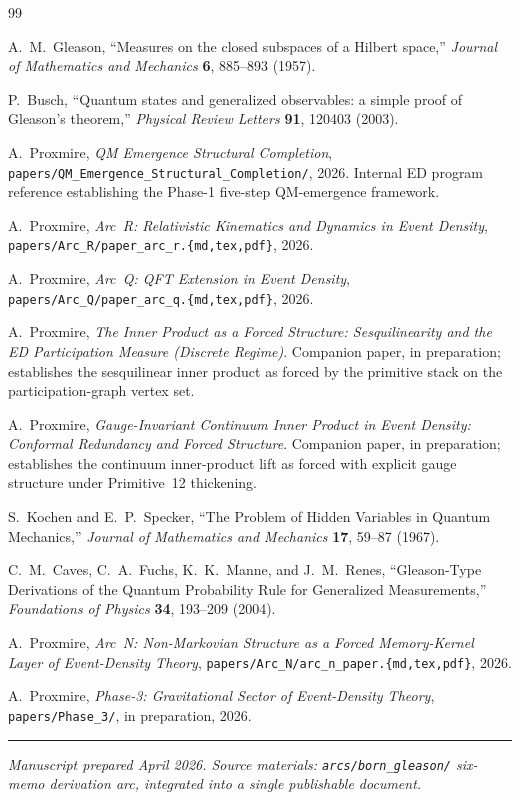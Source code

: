 \documentclass[11pt,a4paper]{article}
\begin{document}
\begin{thebibliography}{99}

A.~M.~Gleason, ``Measures on the closed subspaces of a Hilbert space,'' \emph{Journal of Mathematics and Mechanics} \textbf{6}, 885--893 (1957).

P.~Busch, ``Quantum states and generalized observables: a simple proof of Gleason's theorem,'' \emph{Physical Review Letters} \textbf{91}, 120403 (2003).

A.~Proxmire, \emph{QM Emergence Structural Completion}, \texttt{papers/QM\_Emergence\_Structural\_Completion/}, 2026. Internal ED program reference establishing the Phase-1 five-step QM-emergence framework.

A.~Proxmire, \emph{Arc~R: Relativistic Kinematics and Dynamics in Event Density}, \texttt{papers/Arc\_R/paper\_arc\_r.\{md,tex,pdf\}}, 2026.

A.~Proxmire, \emph{Arc~Q: QFT Extension in Event Density}, \texttt{papers/Arc\_Q/paper\_arc\_q.\{md,tex,pdf\}}, 2026.

A.~Proxmire, \emph{The Inner Product as a Forced Structure: Sesquilinearity and the ED Participation Measure (Discrete Regime)}. Companion paper, in preparation; establishes the sesquilinear inner product as forced by the primitive stack on the participation-graph vertex set.

A.~Proxmire, \emph{Gauge-Invariant Continuum Inner Product in Event Density: Conformal Redundancy and Forced Structure}. Companion paper, in preparation; establishes the continuum inner-product lift as forced with explicit gauge structure under Primitive~12 thickening.

S.~Kochen and E.~P.~Specker, ``The Problem of Hidden Variables in Quantum Mechanics,'' \emph{Journal of Mathematics and Mechanics} \textbf{17}, 59--87 (1967).

C.~M.~Caves, C.~A.~Fuchs, K.~K.~Manne, and J.~M.~Renes, ``Gleason-Type Derivations of the Quantum Probability Rule for Generalized Measurements,'' \emph{Foundations of Physics} \textbf{34}, 193--209 (2004).

A.~Proxmire, \emph{Arc~N: Non-Markovian Structure as a Forced Memory-Kernel Layer of Event-Density Theory}, \texttt{papers/Arc\_N/arc\_n\_paper.\{md,tex,pdf\}}, 2026.

A.~Proxmire, \emph{Phase-3: Gravitational Sector of Event-Density Theory}, \texttt{papers/Phase\_3/}, in preparation, 2026.

\end{thebibliography}

\vspace{1em}
\noindent\rule{\linewidth}{0.4pt}
\vspace{0.2em}

\noindent\emph{Manuscript prepared April 2026. Source materials: \texttt{arcs/born\_gleason/} six-memo derivation arc, integrated into a single publishable document.}
\end{document}
